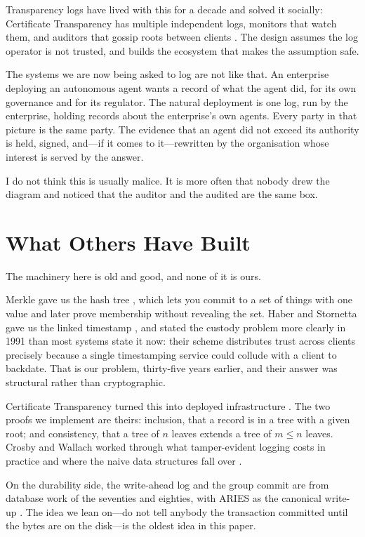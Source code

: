 \documentclass[11pt]{article}
\begin{document}
Transparency logs have lived with this for a decade and solved it socially:
Certificate Transparency has multiple independent logs, monitors that watch
them, and auditors that gossip roots between clients \cite{rfc6962,rfc9162}.
The design assumes the log operator is not trusted, and builds the ecosystem
that makes the assumption safe.

The systems we are now being asked to log are not like that. An enterprise
deploying an autonomous agent wants a record of what the agent did, for its
own governance and for its regulator. The natural deployment is one log, run
by the enterprise, holding records about the enterprise's own agents. Every
party in that picture is the same party. The evidence that an agent did not
exceed its authority is held, signed, and---if it comes to it---rewritten by
the organisation whose interest is served by the answer.

I do not think this is usually malice. It is more often that nobody drew the
diagram and noticed that the auditor and the audited are the same box.

\section{What Others Have Built}
\label{sec:related}

The machinery here is old and good, and none of it is ours.

Merkle gave us the hash tree \cite{merkle1980}, which lets you commit to a set
of things with one value and later prove membership without revealing the set.
Haber and Stornetta gave us the linked timestamp \cite{haber1991}, and stated
the custody problem more clearly in 1991 than most systems state it now: their
scheme distributes trust across clients precisely because a single timestamping
service could collude with a client to backdate. That is our problem, thirty-five
years earlier, and their answer was structural rather than cryptographic.

Certificate Transparency turned this into deployed infrastructure
\cite{rfc6962,rfc9162}. The two proofs we implement are theirs: inclusion, that
a record is in a tree with a given root; and consistency, that a tree of $n$
leaves extends a tree of $m \le n$ leaves. Crosby and Wallach worked through
what tamper-evident logging costs in practice and where the naive data
structures fall over \cite{crosby2009}.

On the durability side, the write-ahead log and the group commit are from
database work of the seventies and eighties, with ARIES as the canonical
write-up \cite{mohan1992}. The idea we lean on---do not tell anybody the
transaction committed until the bytes are on the disk---is the oldest idea in
this paper.
\end{document}
